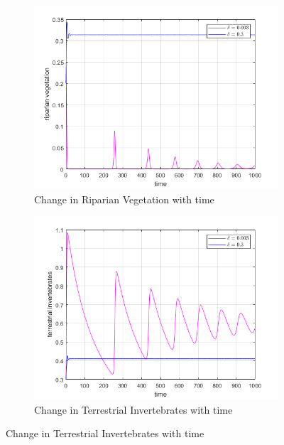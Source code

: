 \documentclass[12pt]{article}
\numberwithin{equation}{section}
\begin{document}
\FloatBarrier
\begin{figure}[bp!]
	\centering
        \caption{Variation in parameter $\delta$}
	\begin{subfigure}[t]{0.45\textwidth}
		\centering
	\includegraphics[width=\textwidth]{time_vs_riparian_delta.png}
		\caption{Change in Riparian Vegetation with time} \label{fig:time_vs_riparian_delta}
	\end{subfigure}
\hspace{0.08\textwidth}
        \begin{subfigure}[t]{0.45\textwidth}
                 \centering
         \includegraphics[width=\textwidth]{time_vs_invertebrates_delta.png}
		\caption{Change in Terrestrial Invertebrates with time} \label{fig:time_vs_invertebrates_delta}

\end{subfigure}
\end{figure}
\end{document}
